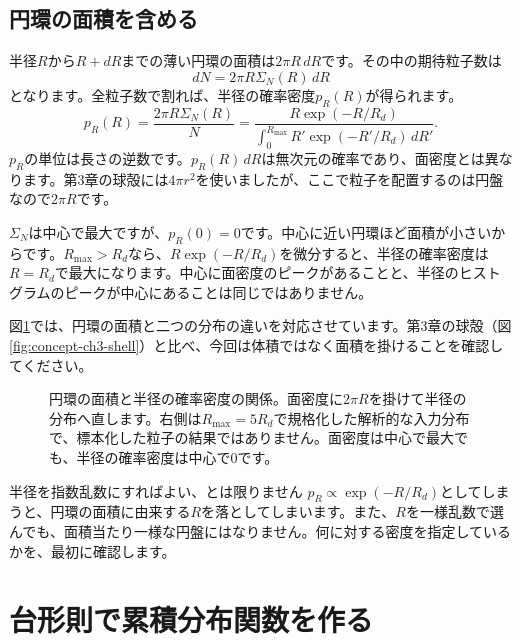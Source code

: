 \subsection{円環の面積を含める}
半径$R$から$R+dR$までの薄い円環の面積は$2\pi R\,dR$です。その中の期待粒子数は
\begin{equation}
dN=2\pi R\Sigma_N(R)\,dR
\label{eq:ch4-annulus}
\end{equation}
となります。全粒子数で割れば、半径の確率密度$p_R(R)$が得られます。
\begin{equation}
p_R(R)=\frac{2\pi R\Sigma_N(R)}{N}
       =\frac{R\exp(-R/R_d)}{\displaystyle\int_0^{R_{\max}}R'\exp(-R'/R_d)\,dR'}.
\label{eq:ch4-radial-pdf}
\end{equation}
$p_R$の単位は長さの逆数です。$p_R(R)\,dR$は無次元の確率であり、面密度とは異なります。第3章の球殻には$4\pi r^2$を使いましたが、ここで粒子を配置するのは円盤なので$2\pi R$です。

$\Sigma_N$は中心で最大ですが、$p_R(0)=0$です。中心に近い円環ほど面積が小さいからです。$R_{\max}>R_d$なら、$R\exp(-R/R_d)$を微分すると、半径の確率密度は$R=R_d$で最大になります。中心に面密度のピークがあることと、半径のヒストグラムのピークが中心にあることは同じではありません。


図\ref{fig:concept-ch4-annulus}では、円環の面積と二つの分布の違いを対応させています。第3章の球殻（図\ref{fig:concept-ch3-shell}）と比べ、今回は体積ではなく面積を掛けることを確認してください。
\begin{figure}[!htbp]
\centering

\caption{円環の面積と半径の確率密度の関係。面密度に$2\pi R$を掛けて半径の分布へ直します。右側は$R_{\max}=5R_d$で規格化した解析的な入力分布で、標本化した粒子の結果ではありません。面密度は中心で最大でも、半径の確率密度は中心で0です。}
\label{fig:concept-ch4-annulus}
\end{figure}
\FloatBarrier

\begin{failbox}{半径を指数乱数にすればよい、とは限りません}
$p_R\propto\exp(-R/R_d)$としてしまうと、円環の面積に由来する$R$を落としてしまいます。また、$R$を一様乱数で選んでも、面積当たり一様な円盤にはなりません。何に対する密度を指定しているかを、最初に確認します。
\end{failbox}

\section{台形則で累積分布関数を作る}
\label{sec:ch4-cdf}

